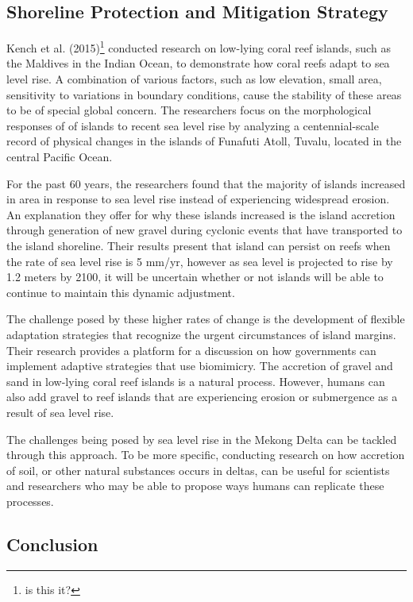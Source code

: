 \subsection{Shoreline Protection and Mitigation Strategy}

Kench et al. (2015)\footnote{\citet{kench2015coral} is this it?} conducted research on low-lying coral reef islands, such as the Maldives in the Indian Ocean, to demonstrate how coral reefs adapt to sea level rise. A combination of various factors, such as low elevation, small area, sensitivity to variations in boundary conditions, cause the stability of these areas to be of special global concern. The researchers focus on the morphological responses of of islands to recent sea level rise by analyzing a centennial-scale record of physical changes in the islands of Funafuti Atoll, Tuvalu, located in the central Pacific Ocean. 

For the past 60 years, the researchers found that the majority of islands increased in area in response to sea level rise instead of experiencing widespread erosion. An explanation they offer for why these islands increased is the island accretion through generation of new gravel during cyclonic events that have transported to the island shoreline. Their results present that island can persist on reefs when the rate of sea level rise is 5 mm/yr, however as sea level is projected to rise by 1.2 meters by 2100, it will be uncertain whether or not islands will be able to continue to maintain this dynamic adjustment. 

The challenge posed by these higher rates of change is the development of flexible adaptation strategies that recognize the urgent circumstances of island margins. Their research provides a platform for a discussion on how governments can implement adaptive strategies that use biomimicry. The accretion of gravel and sand in low-lying coral reef islands is a natural process. However, humans can also add gravel to reef islands that are experiencing erosion or submergence as a result of sea level rise. 

The challenges being posed by sea level rise in the Mekong Delta can be tackled through this approach. To be more specific, conducting research on how accretion of soil, or other natural substances occurs in deltas, can be useful for scientists and researchers who may be able to propose ways humans can  replicate these processes. 

\subsection{Conclusion}

